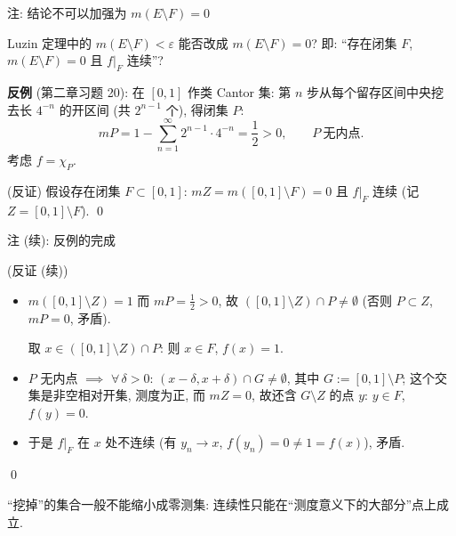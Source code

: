 
\begin{frame}{注: 结论不可以加强为 $m(E \setminus F) = 0$}

\begin{question}
Luzin 定理中的 $m(E \setminus F) < \varepsilon$ 能否改成 $m(E \setminus F) = 0$?
即: ``存在闭集 $F$, $m(E \setminus F) = 0$ 且 $f\big|_F$ 连续''?
\end{question}

\textbf{反例} (第二章习题 20): 在 $[0,1]$ 作\alert{类 Cantor 集}: 第 $n$ 步从每个留存区间中央挖去长
$4^{-n}$ 的开区间 (共 $2^{n-1}$ 个), 得闭集 $P$:
\[
mP = 1 - \sum_{n=1}^{\infty} 2^{n-1} \cdot 4^{-n} = \frac12 > 0,
\qquad
P\ \text{无内点}.
\]
考虑 $f = \chi_P$.

\pause

\startproof[bg=yellow, fg=red](反证)
假设存在闭集 $F \subset [0,1]$: $mZ = m([0,1] \setminus F) = 0$ 且 $f\big|_F$ 连续
(记 $Z = [0,1] \setminus F$).
\qed

\end{frame}


\begin{frame}{注 (续): 反例的完成}

\startproof[bg=yellow, fg=red](反证 (续))
\begin{itemize}
\item $m([0,1] \setminus Z) = 1$ 而 $mP = \frac12 > 0$, 故
  $([0,1] \setminus Z) \cap P \neq \emptyset$ (否则 $P \subset Z$, $mP = 0$, 矛盾).

  取 $x \in ([0,1] \setminus Z) \cap P$: 则 $x \in F$, $f(x) = 1$.

\pause
\item $P$ 无内点 $\implies$ $\forall\, \delta > 0$:
  $(x - \delta, x + \delta) \cap G \neq \emptyset$, 其中 $G := [0,1] \setminus P$;
  这个交集是非空相对开集, 测度为正, 而 $mZ = 0$, 故还含
  $G \setminus Z$ 的点 $y$: $y \in F$, $f(y) = 0$.

\pause
\item 于是 $f\big|_F$ 在 $x$ 处不连续 (有 $y_n \to x$, $f(y_n) = 0 \neq 1 = f(x)$), 矛盾.
\end{itemize}
\qed

\begin{attnblock}
``挖掉''的集合一般不能缩小成\alert{零测集}: 连续性只能在``测度意义下的大部分''点上成立.
\end{attnblock}

\end{frame}


